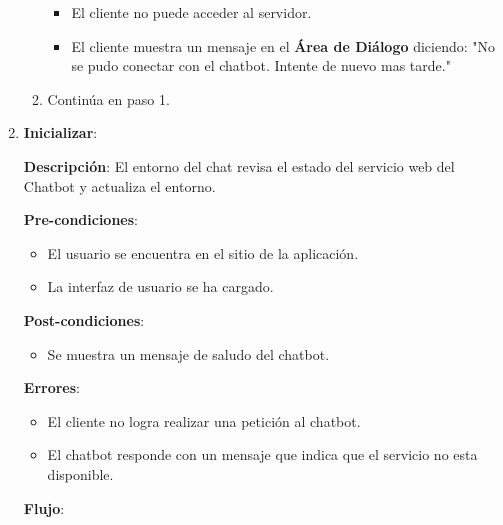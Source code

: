 \begin{enumerate}[leftmargin=2.5cm ,label={\bfseries CU-\arabic*}]
\begin{enumerate}[label=\arabic*)]
                \begin{itemize}
                    \item El cliente no puede acceder al servidor.
                    \item El cliente muestra un mensaje en el \textbf{Área de Diálogo} diciendo: "No se pudo conectar con el chatbot. Intente de nuevo mas tarde."
                \end{itemize}
            \item Continúa en paso 1.
        \end{enumerate}
        \noindent\makebox[\linewidth]{\rule{\textwidth}{0.4pt}}
    
    \item \textbf{Inicializar}: 
    
        \textbf{Descripción}: El entorno del chat revisa el estado del servicio web del Chatbot y actualiza el entorno.
        
        \textbf{Pre-condiciones}: 
        
        \begin{itemize}
            \item El usuario se encuentra en el sitio de la aplicación.
            \item La interfaz de usuario se ha cargado.
        \end{itemize}
        
        \textbf{Post-condiciones}: 
        
        \begin{itemize}
            \item Se muestra un mensaje de saludo del chatbot.
        \end{itemize}
        
        \textbf{Errores}: 
        
        \begin{itemize}
            \item El cliente no logra realizar una petición al chatbot.
            \item El chatbot responde con un mensaje que indica que el servicio no esta disponible.
        \end{itemize}
        
        \textbf{Flujo}:
        

\end{enumerate}

